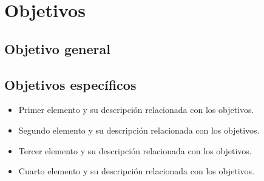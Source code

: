 \section{Objetivos}

\subsection{Objetivo general}
\blindtext[1]

\subsection{Objetivos específicos}

\begin{itemize}
	\item Primer elemento y su descripción relacionada con los objetivos.
	\item Segundo elemento y su descripción relacionada con los objetivos.
	\item Tercer elemento y su descripción relacionada con los objetivos.
	\item Cuarto elemento y su descripción relacionada con los objetivos.
\end{itemize}
